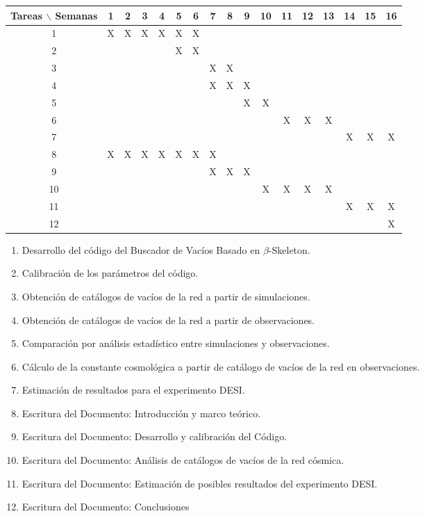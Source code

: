 \documentclass[preprint]{aastex62}
\begin{document}
  \begin{table}[htb]
    \begin{tabular}{|c|cccccccccccccccc| }
      \hline
      Tareas $\backslash$ Semanas & 1 & 2 & 3 & 4 & 5 & 6 & 7 & 8 & 9 & 10 & 11 & 12 & 13 & 14 & 15 & 16  \\
      \hline
      1 & X & X & X & X & X & X &   &   &   &   &   &   &   &   &   &   \\
      2 &   &   &   &   & X & X &   &   &   &   &   &   &   &   &   &   \\
      3 &   &   &   &   &   &   & X & X &   &   &   &   &   &   &   &   \\
      4 &   &   &   &   &   &   & X & X & X &   &   &   &   &   &   &   \\
      5 &   &   &   &   &   &   &   &   & X & X &   &   &   &   &   &   \\
      6 &   &   &   &   &   &   &   &   &   &   & X & X & X &   &   &   \\
      7 &   &   &   &   &   &   &   &   &   &   &   &   &   & X & X & X \\
      8 & X & X & X & X & X & X & X &   &   &   &   &   &   &   &   &   \\
      9 &   &   &   &   &   &   & X & X & X &   &   &   &   &   &   &   \\
      10&   &   &   &   &   &   &   &   &   & X & X & X & X &   &   &   \\
      11&   &   &   &   &   &   &   &   &   &   &   &   &   & X & X & X \\
      12&   &   &   &   &   &   &   &   &   &   &   &   &   &   &   & X \\
      \hline
    \end{tabular}
  \end{table}

  
  \begin{enumerate}
  \item Desarrollo del código del Buscador de Vacíos Basado en $\beta$-Skeleton.
  \item Calibración de los parámetros del código.
  \item Obtención de catálogos de vacíos de la red a partir de simulaciones.
  \item Obtención de catálogos de vacíos de la red a partir de observaciones.
  \item Comparación por análisis estadístico entre simulaciones y observaciones.
  \item Cálculo de la constante cosmológica a partir de catálogo de vacíos de la red en
    observaciones.
  \item Estimación de resultados para el experimento DESI.
  \item Escritura del Documento: Introducción y marco teórico.
  \item Escritura del Documento: Desarrollo y calibración del Código.
  \item Escritura del Documento: Análisis de catálogos de vacíos de la red cósmica. 
  \item Escritura del Documento: Estimación de posibles resultados del experimento DESI.
  \item Escritura del Documento: Conclusiones
  \end{enumerate}
  
\end{document}
